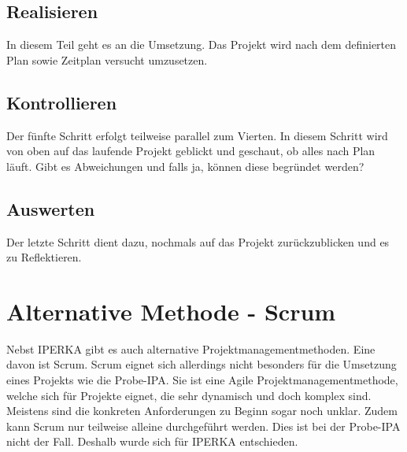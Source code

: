 \subsection{Realisieren}
In diesem Teil geht es an die Umsetzung. Das Projekt wird nach dem definierten Plan sowie Zeitplan versucht umzusetzen.

\subsection{Kontrollieren}
Der fünfte Schritt erfolgt teilweise parallel zum Vierten. In diesem Schritt wird von oben auf das laufende Projekt geblickt und geschaut, ob alles nach Plan läuft. Gibt es Abweichungen und falls ja, können diese begründet werden?

\subsection{Auswerten}
Der letzte Schritt dient dazu, nochmals auf das Projekt zurückzublicken und es zu Reflektieren.

\section{Alternative Methode - Scrum}\label{sec:alternative-methode}
Nebst IPERKA gibt es auch alternative Projektmanagementmethoden. Eine davon ist Scrum. 
Scrum eignet sich allerdings nicht besonders für die Umsetzung eines Projekts wie die Probe-IPA.  Sie ist eine Agile Projektmanagementmethode, welche sich für Projekte eignet, die sehr dynamisch und doch komplex sind. Meistens sind die konkreten Anforderungen zu Beginn sogar noch unklar. Zudem kann Scrum nur teilweise alleine durchgeführt werden.
Dies ist bei der Probe-IPA nicht der Fall. Deshalb wurde sich für IPERKA entschieden.